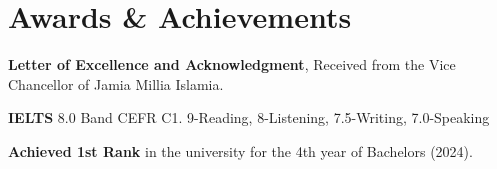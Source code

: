 \section{Awards \& Achievements}
 \begin{itemize}[leftmargin=0.0in, label={}]
    \small{\item{

    \vspace{1pt}
    \textbf{\normalsize{}}{\normalsize \textbf{Letter of Excellence and Acknowledgment}, Received from the Vice Chancellor of Jamia Millia Islamia.} 
    
    \textbf{\normalsize{}}{ \normalsize \textbf{IELTS} 8.0 Band CEFR C1. 9-Reading, 8-Listening, 7.5-Writing, 7.0-Speaking} 
    
     \vspace{1pt}
    \textbf{\normalsize{}}{ \normalsize \textbf{Achieved 1st Rank} in the university for the 4th year of Bachelors (2024).} 
    }}
 \end{itemize}
